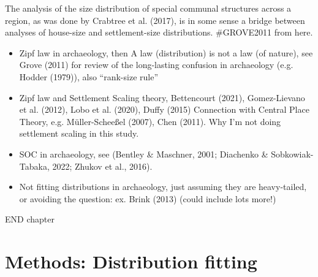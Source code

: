 \documentclass[
  12pt,
]{book}
\begin{document}
The analysis of the size distribution of special communal structures across a region, as was done by Crabtree et al. (2017), is in some sense a bridge between analyses of house-size and settlement-size distributions. \#GROVE2011 from here.

\begin{itemize}
\item
  Zipf law in archaeology, then A law (distribution) is not a law (of nature), see Grove (2011) for review of the long-lasting confusion in archaeology (e.g. Hodder (1979)), also ``rank-size rule''
\item
  Zipf law and Settlement Scaling theory, Bettencourt (2021), Gomez-Lievano et al. (2012), Lobo et al. (2020), Duffy (2015) Connection with Central Place Theory, e.g. Müller-Scheeßel (2007), Chen (2011). Why I'm not doing settlement scaling in this study.
\item
  SOC in archaeology, see (Bentley \& Maschner, 2001; Diachenko \& Sobkowiak-Tabaka, 2022; Zhukov et al., 2016).
\item
  Not fitting distributions in archaeology, just assuming they are heavy-tailed, or avoiding the question: ex. Brink (2013) (could include lots more!)
\end{itemize}

END chapter

\hypertarget{methods-distfit}{%
\chapter{Methods: Distribution fitting}\label{methods-distfit}}
\end{document}
